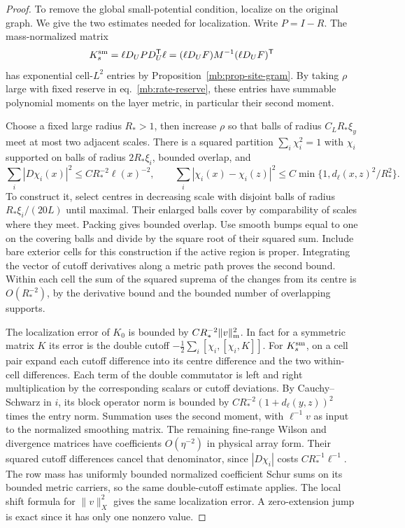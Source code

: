 \documentclass[11pt,letterpaper,reqno]{amsart}
\numberwithin{equation}{section}
\renewcommand{\eqref}[1]{\textup{eq.~\ref{#1}}}
\theoremstyle{definition}
\theoremstyle{remark}
\begin{document}
\begin{proof}
To remove the global small-potential condition, localize on
the original graph. We give the two estimates needed for
localization. Write \(P=I-R\). The mass-normalized matrix
\[
 K_s^{\rm sm}=\ell D_U P D_U^{\mathsf T}\ell
     =(\ell D_UF)M^{-1}(\ell D_UF)^{\mathsf T}
\]
has exponential cell-\(L^2\) entries by
Proposition~\ref{mb:prop-site-gram}. By taking \(\rho\)
large with fixed reserve in \eqref{mb:rate-reserve},
these entries have summable polynomial moments on the
layer metric, in particular their second moment.

Choose a fixed large radius \(R_*>1\), then increase
\(\rho\) so that balls of radius \(C_L R_*\xi_y\) meet
at most two adjacent scales. There is a squared partition
\(\sum_i\chi_i^2=1\) with \(\chi_i\) supported on balls of
radius \(2R_*\xi_i\), bounded overlap, and
\[
 \sum_i|D\chi_i(x)|^2\le C R_*^{-2}\ell(x)^{-2},\qquad
 \sum_i|\chi_i(x)-\chi_i(z)|^2\le
                       C\min\{1,d_\ell(x,z)^2/R_*^2\}.
\]
To construct it, select centres in decreasing scale
with disjoint balls of radius \(R_*\xi_i/(20L)\)
until maximal. Their enlarged balls cover by
comparability of scales where they meet. Packing
gives bounded overlap. Use smooth bumps equal to one
on the covering balls and divide by the square root of
their squared sum. Include bare exterior cells for this
construction if the active region is proper. Integrating
the vector of cutoff derivatives along a metric path
proves the second bound. Within each cell the sum of
the squared suprema of the changes from its centre
is \(O(R_*^{-2})\), by the derivative bound and the
bounded number of overlapping supports.

The localization error of \(K_0\) is bounded by
\(CR_*^{-2}\|v\|_{\rm m}^2\). In fact for a symmetric
matrix \(K\) its error is the double cutoff
\(-\tfrac12\sum_i[\chi_i,[\chi_i,K]]\).
For \(K_s^{\rm sm}\), on a cell pair expand each cutoff
difference into its centre difference and the two
within-cell differences. Each term of the double
commutator is left and right multiplication by the
corresponding scalars or cutoff deviations. By
Cauchy--Schwarz in \(i\), its block operator norm is
bounded by \(CR_*^{-2}(1+d_\ell(y,z))^2\) times the
entry norm. Summation uses the second moment, with
\(\ell^{-1}v\) as input to the normalized smoothing
matrix. The remaining fine-range Wilson and divergence
matrices have coefficients \(O(\eta^{-2})\) in physical
array form. Their squared cutoff differences cancel
that denominator, since \(|D\chi_i|\) costs
\(C R_*^{-1}\ell^{-1}\).
The row mass has uniformly bounded normalized coefficient
Schur sums on its bounded metric carriers, so the same
double-cutoff estimate applies. The local shift formula
for \(\|v\|_X^2\) gives the same localization error.
A zero-extension jump is exact since it has only one
nonzero value.


\end{proof}
\end{document}
